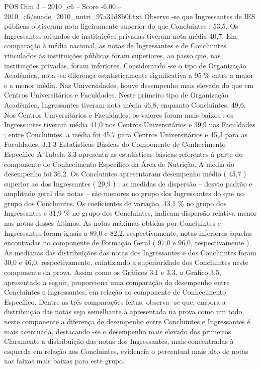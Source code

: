\begin{textsample}{POS Dim 3 – 2010\_c6 – Score -6.00 – 2010\_c6/enade\_2010\_nutri\_97a31d8b0f.txt}
Observe -se que Ingressantes de IES públicas obtiveram nota ligeiramente superior do que Concluintes : 53,5.
Os Ingressantes oriundos de instituições privadas tiveram nota média 40,7.
Em comparação à média nacional, as notas de Ingressantes e de Concluintes vinculados às instituições públicas foram superiores, ao passo que, nas instituições privadas, foram inferiores.
Considerando -se o tipo de Organização Acadêmica, nota -se diferença estatisticamente significativa a 95 \% entre a maior e a menor média.
Nas Universidades, houve desempenho mais elevado do que em Centros Universitários e Faculdades.
Neste primeiro tipo de Organização Acadêmica, Ingressantes tiveram nota média 46,8, enquanto Concluintes, 49,6.
Nos Centros Universitários e Faculdades, os valores foram mais baixos : os Ingressantes tiveram média 41,0 nos Centros Universitários e 39,9 nas Faculdades ; entre Concluintes, a média foi 45,7 para Centros Universitários e 45,3 para as Faculdades. 3.1.3 Estatísticas Básicas do Componente de Conhecimento Específico A Tabela 3.3 apresenta as estatísticas básicas referentes à parte do componente de Conhecimento Específico da Área de Nutrição.
A média do desempenho foi 36,2.
Os Concluintes apresentaram desempenho médio ( 45,7 ) superior ao dos Ingressantes ( 29,9 ) ; as medidas de dispersão – desvio padrão e amplitude geral das notas – são menores no grupo dos Ingressantes do que no grupo dos Concluintes.
Os coeficientes de variação, 43,1 \% no grupo dos Ingressantes e 31,9 \% no grupo dos Concluintes, indicam dispersão relativa menor nas notas desses últimos.
As notas máximas obtidas por Concluintes e Ingressantes foram iguais a 89,0 e 82,2, respectivamente, notas inferiores àquelas encontradas no componente de Formação Geral ( 97,0 e 96,0, respectivamente ).
As medianas das distribuições das notas dos Ingressantes e dos Concluintes foram 30,0 e 46,0, respectivamente, enfatizando a superioridade dos Concluintes neste componente da prova.
Assim como os Gráficos 3.1 e 3.3, o Gráfico 3.5, apresentado a seguir, proporciona uma comparação do desempenho entre Concluintes e Ingressantes, em relação ao componente de Conhecimento Específico.
Dentre as três comparações feitas, observa -se que, embora a distribuição das notas seja semelhante à apresentada na prova como um todo, neste componente a diferença de desempenho entre Concluintes e Ingressantes é mais acentuada, destacando -se o desempenho mais elevado dos primeiros.
Claramente a distribuição das notas dos Ingressantes, mais concentradas à esquerda em relação aos Concluintes, evidencia o percentual mais alto de notas nas faixas mais baixas para este grupo.

\end{textsample}
